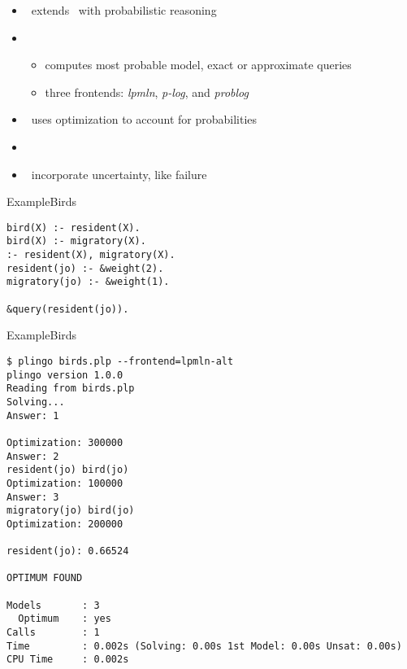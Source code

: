 \begin{frame}{\plingo}
  \begin{itemize}
  \item {} \ extends \clingo\ with probabilistic reasoning
  \item {}
  \begin{itemize}
  \item computes most probable model, exact or approximate queries
  \item three frontends: \textit{lpmln}, \textit{p-log}, and \textit{problog}
  \end{itemize}
  \item {}   \  uses optimization to account for probabilities
  \item {}   \ \cite{hajakarorusc22a}
  \item {} \ incorporate uncertainty, like failure
  \end{itemize}
\end{frame}

\begin{frame}[fragile]{Example}{Birds}
\begin{lstlisting}[escapeinside=||]
bird(X) :- resident(X).
bird(X) :- migratory(X).
:- resident(X), migratory(X).
resident(jo) :- &weight(2).
migratory(jo) :- &weight(1).

&query(resident(jo)).
\end{lstlisting}
\end{frame}

\begin{frame}[fragile]{Example}{Birds}
\begin{adjustbox}{max totalsize={\textwidth}{.75\textheight},keepaspectratio}
\begin{lstlisting}[escapeinside=||]
$ plingo birds.plp --frontend=lpmln-alt
plingo version 1.0.0
Reading from birds.plp
Solving...
Answer: 1

Optimization: 300000
Answer: 2
resident(jo) bird(jo)
Optimization: 100000
Answer: 3
migratory(jo) bird(jo)
Optimization: 200000

resident(jo): 0.66524

OPTIMUM FOUND

Models       : 3
  Optimum    : yes
Calls        : 1
Time         : 0.002s (Solving: 0.00s 1st Model: 0.00s Unsat: 0.00s)
CPU Time     : 0.002s
\end{lstlisting}
\end{adjustbox}
\end{frame}

%
